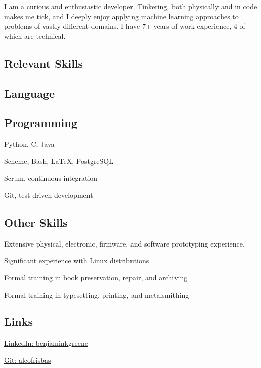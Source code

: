 \documentclass{cv}
\begin{document}
\linespread{0.9}
\noindent{}
I am a curious and enthusiastic developer. Tinkering, both physically and in code makes me tick,
and I deeply enjoy applying machine learning approaches to problems of vastly different domains.
I have 7+ years of work experience, 4 of which are technical.
\begin{paracol}{2}
\begin{raggedright}
\section{Relevant Skills}
\subsection{Language}
\subsection{Programming}
\begin{closeitems}
\item Python, C, Java
\item Scheme, Bash, \LaTeX, PostgreSQL
\item Scrum, continuous integration
\item Git, test-driven development
\end{closeitems}
\subsection{Other Skills}
\begin{closeitems}
\item Extensive physical, electronic, firmware, and software prototyping experience.
\item Significant experience with Linux distributions
\item Formal training in book preservation, repair, and archiving
\item Formal training in typesetting, printing, and metalsmithing
\end{closeitems}
\subsection{Links}
\begin{closeitems}
\item \href{http://www.linkedin.com/in/benjaminkgreene}{LinkedIn: \small{benjaminkgreene}}
\item \href{http://www.github.com/alcofrisbas}{Git: \small{alcofrisbas}}
\end{closeitems}

\end{raggedright}
\end{paracol}
\end{document}
